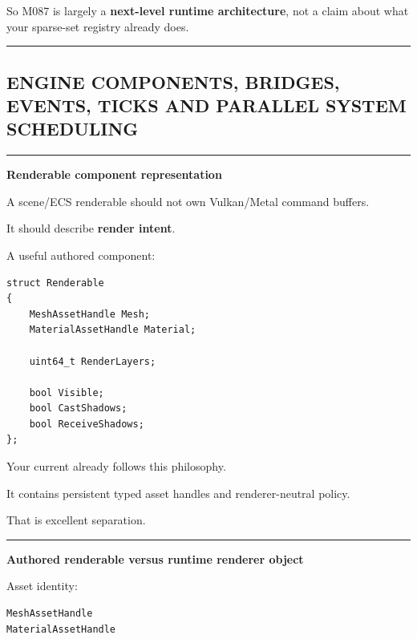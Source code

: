 So M087 is largely a \textbf{next-level runtime architecture}, not a claim about what your sparse-set registry already does.

\begin{center}\rule{0.5\linewidth}{0.5pt}\end{center}

\subsection{ENGINE COMPONENTS, BRIDGES, EVENTS, TICKS AND PARALLEL SYSTEM SCHEDULING}\label{05-engine-i-ch016-engine-components-bridges-events-ticks-and-parallel-system-scheduling}

\hypertarget{05-engine-i-ch016-engine-components-bridges-events-ticks-and-parallel-system-scheduling}{}

\begin{center}\rule{0.5\linewidth}{0.5pt}\end{center}

\textbf{Renderable component representation}

A scene/ECS renderable should not own Vulkan/Metal command buffers.

It should describe \textbf{render intent}.

A useful authored component:

\begin{verbatim}
struct Renderable
{
    MeshAssetHandle Mesh;
    MaterialAssetHandle Material;

    uint64_t RenderLayers;

    bool Visible;
    bool CastShadows;
    bool ReceiveShadows;
};
\end{verbatim}

Your current  already follows this philosophy.

It contains persistent typed asset handles and renderer-neutral policy.

That is excellent separation.

\begin{center}\rule{0.5\linewidth}{0.5pt}\end{center}

\textbf{Authored renderable versus runtime renderer object}

Asset identity:

\begin{verbatim}
MeshAssetHandle
MaterialAssetHandle
\end{verbatim}

